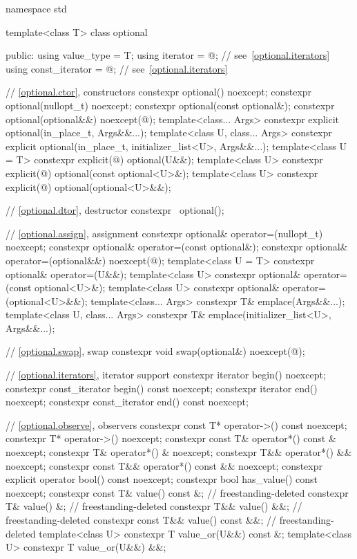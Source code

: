 %
%
\begin{codeblock}
namespace std {
  template<class T>
  class optional {
  public:
    using value_type     = T;
    using iterator       = @\impdefnc@;              // see~\ref{optional.iterators}
    using const_iterator = @\impdefnc@;              // see~\ref{optional.iterators}

    // \ref{optional.ctor}, constructors
    constexpr optional() noexcept;
    constexpr optional(nullopt_t) noexcept;
    constexpr optional(const optional&);
    constexpr optional(optional&&) noexcept(@\seebelow@);
    template<class... Args>
      constexpr explicit optional(in_place_t, Args&&...);
    template<class U, class... Args>
      constexpr explicit optional(in_place_t, initializer_list<U>, Args&&...);
    template<class U = T>
      constexpr explicit(@\seebelow@) optional(U&&);
    template<class U>
      constexpr explicit(@\seebelow@) optional(const optional<U>&);
    template<class U>
      constexpr explicit(@\seebelow@) optional(optional<U>&&);

    // \ref{optional.dtor}, destructor
    constexpr ~optional();

    // \ref{optional.assign}, assignment
    constexpr optional& operator=(nullopt_t) noexcept;
    constexpr optional& operator=(const optional&);
    constexpr optional& operator=(optional&&) noexcept(@\seebelow@);
    template<class U = T> constexpr optional& operator=(U&&);
    template<class U> constexpr optional& operator=(const optional<U>&);
    template<class U> constexpr optional& operator=(optional<U>&&);
    template<class... Args> constexpr T& emplace(Args&&...);
    template<class U, class... Args> constexpr T& emplace(initializer_list<U>, Args&&...);

    // \ref{optional.swap}, swap
    constexpr void swap(optional&) noexcept(@\seebelow@);

    // \ref{optional.iterators}, iterator support
    constexpr iterator begin() noexcept;
    constexpr const_iterator begin() const noexcept;
    constexpr iterator end() noexcept;
    constexpr const_iterator end() const noexcept;

    // \ref{optional.observe}, observers
    constexpr const T* operator->() const noexcept;
    constexpr T* operator->() noexcept;
    constexpr const T& operator*() const & noexcept;
    constexpr T& operator*() & noexcept;
    constexpr T&& operator*() && noexcept;
    constexpr const T&& operator*() const && noexcept;
    constexpr explicit operator bool() const noexcept;
    constexpr bool has_value() const noexcept;
    constexpr const T& value() const &;                                 // freestanding-deleted
    constexpr T& value() &;                                             // freestanding-deleted
    constexpr T&& value() &&;                                           // freestanding-deleted
    constexpr const T&& value() const &&;                               // freestanding-deleted
    template<class U> constexpr T value_or(U&&) const &;
    template<class U> constexpr T value_or(U&&) &&;

}}
\end{codeblock}
